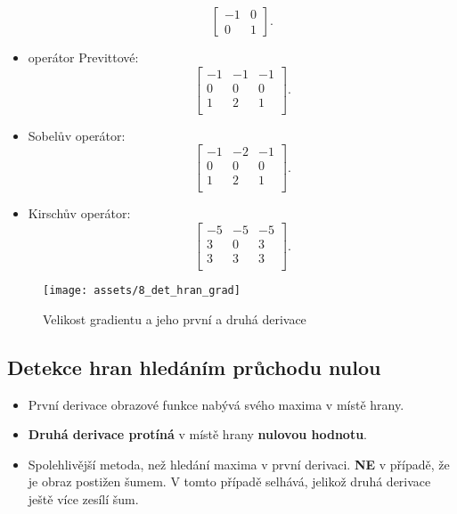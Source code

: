 \begin{itemize}
\begin{equation*}
              \begin{bmatrix}
                  -1 & 0 \\[0.3em]
                  0  & 1
              \end{bmatrix}.
          \end{equation*}
    \item operátor Previttové:
          \begin{equation*}
              \begin{bmatrix}
                  -1 & -1 & -1 \\[0.3em]
                  0  & 0  & 0  \\[0.3em]
                  1  & 2  & 1  \\
              \end{bmatrix}.
          \end{equation*}
    \item Sobelův operátor:
          \begin{equation*}
              \begin{bmatrix}
                  -1 & -2 & -1 \\[0.3em]
                  0  & 0  & 0  \\[0.3em]
                  1  & 2  & 1  \\
              \end{bmatrix}.
          \end{equation*}
    \item Kirschův operátor:
          \begin{equation*}
              \begin{bmatrix}
                  -5 & -5 & -5 \\[0.3em]
                  3  & 0  & 3  \\[0.3em]
                  3  & 3  & 3  \\
              \end{bmatrix}.
          \end{equation*}
\end{itemize}
\begin{figure}[H]
    \begin{center}
        \texttt{[image: assets/8\_det\_hran\_grad]}
        \caption{Velikost gradientu a jeho první a druhá derivace}
    \end{center}
\end{figure}
\subsection{Detekce hran hledáním průchodu nulou}
\begin{itemize}
    \item První derivace obrazové funkce nabývá svého maxima v místě hrany.
    \item \textbf{Druhá derivace protíná} v místě hrany \textbf{nulovou hodnotu}.
    \item Spolehlivější metoda, než hledání maxima v první derivaci. \textbf{NE} v případě, že je obraz postižen šumem. V tomto případě selhává, jelikož druhá derivace ještě více zesílí šum.
\end{itemize}

